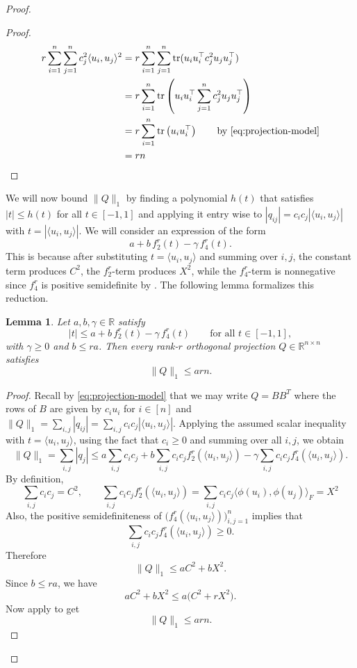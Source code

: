 \documentclass[12pt]{amsart}
\newtheorem{lemma}[lemma]{Lemma}
\theoremstyle{myremark}
\DeclareMathOperator{\tr}{tr}
\newcommand{\R}{\mathbb{R}}
\newcommand{\1}{\mathbf{1}}
\newcommand{\inner}[2]{\langle #1,#2\rangle}
\newcommand{\froinner}[2]{\langle #1,#2\rangle_{\!F}}
\newcommand{\abs}[1]{\lvert #1\rvert}
\begin{document}
\begin{proof}
\begin{proof}
\begin{align*}
r \sum_{i=1}^n \sum_{j=1}^n c_j^2 \inner{u_i}{u_j}^2
&= r \sum_{i=1}^n \sum_{j=1}^n \tr(u_i u_i^\top c_j^2 u_j u_j^\top)\\
&= r \sum_{i=1}^n  \tr\left(u_i u_i^\top \sum_{j=1}^n c_j^2 u_j u_j^\top\right)\\
&= r \sum_{i=1}^n  \tr\left(u_i u_i^\top\right) \text{\qquad by \Cref{eq:projection-model}}\\
&= r n
\end{align*}
\end{proof}



We will now bound \(\|Q\|_1\) by finding a polynomial $h(t)$ that satisfies $|t| \leq h(t)$ for all $t \in [-1,1]$ and applying it entry wise to $|q_{ij}| = c_i c_j |\inner{u_i}{u_j}|$ with $t = |\inner{u_i}{u_j}|$. We will consider an expression of the form
\[
a+b\,f_2^r(t)-\gamma\,f_4^r(t).
\]
This is because after substituting \(t=\inner{u_i}{u_j}\) and summing over \(i,j\), the constant term produces $C^2$, the \(f_2^r\)-term produces \(X^2\), while the \(f_4^r\)-term is nonnegative since $f_4^r$ is positive semidefinite by . The following lemma formalizes this reduction.

\begin{lemma}\label{lem:abstract-majorant}
Let \(a,b,\gamma\in\R\) satisfy
\[
\abs{t}\le a+b\,f_2^r(t)-\gamma\,f_4^r(t)
\qquad\text{for all } t\in[-1,1],
\]
with \(\gamma\ge 0\) and \(b\le ra\). Then every rank-\(r\) orthogonal projection \(Q\in\R^{n\times n}\) satisfies
\[
\|Q\|_1\le arn.
\]
\end{lemma}

\begin{proof}
Recall by \eqref{eq:projection-model} that we may write $Q = BB^T$ where the rows of $B$ are given by $c_i u_i$ for $i \in [n]$ and $\|Q\|_1 = \sum_{i,j} |q_{ij}| = \sum_{i,j} c_i c_j |\inner{u_i}{u_j}|$. Applying the assumed scalar inequality with \(t=\inner{u_i}{u_j}\), using the fact that $c_i \geq 0$ and summing over all \(i,j\), we obtain
\[
\|Q\|_1 = \sum_{i,j} |q_j|
\le a\sum_{i,j} c_i c_j
+b\sum_{i,j} c_i c_j f_2^r(\inner{u_i}{u_j})
-\gamma\sum_{i,j} c_i c_j f_4^r(\inner{u_i}{u_j}).
\]
By definition,
\[
\sum_{i,j} c_i c_j=C^2,
\qquad
\sum_{i,j} c_i c_j f_2^r(\inner{u_i}{u_j}) = \sum_{i,j} c_i c_j \froinner{\phi(u_i)}{\phi(u_j)} = X^2
\]
Also, the positive semidefiniteness of \(\bigl(f_4^r(\inner{u_i}{u_j})\bigr)_{i,j=1}^n\) implies that
\[
\sum_{i,j} c_i c_j f_4^r(\inner{u_i}{u_j})\ge 0.
\]
Therefore
\[
\|Q\|_1\le aC^2+bX^2.
\]
Since \(b\le ra\), we have
\[
aC^2+bX^2\le a\bigl(C^2+rX^2\bigr).
\]
Now apply  to get
\[
\|Q\|_1\le arn.
\]
\end{proof}


\end{proof}
\end{document}
